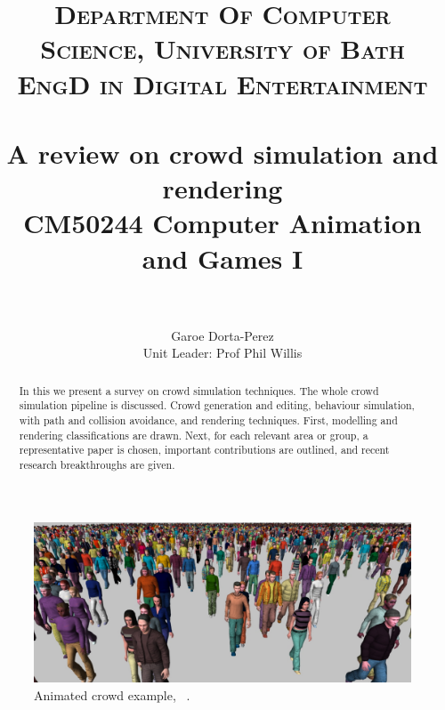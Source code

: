 \documentclass[6pt]{article} %
\title{	
\normalfont \normalsize 
\textsc{Department Of Computer Science, University of Bath} \\ [5pt] %
\textsc{EngD in Digital Entertainment} \\ [5pt] 
\horrule{0.7pt} \\[0.2cm] %
\Huge A review on crowd simulation and rendering \\ %
\vspace{7 mm}
\Large CM50244 \: Computer Animation and Games I \\
\horrule{0.7pt} \\[0.0cm] %
}
\author{Garoe Dorta-Perez \\ \Large Unit Leader: Prof Phil Willis \\}  %
\begin{document}
\vspace*{\fill}
\begin{center}
	\begin{minipage}{1.0\textwidth}
		\maketitle %
		\thispagestyle{empty}
	\end{minipage}
\end{center}



\vfill %
\begin{abstract}
\normalsize %
In this we present a survey on crowd simulation techniques.
The whole crowd simulation pipeline is discussed.
Crowd generation and editing, behaviour simulation, with path and collision avoidance, and rendering techniques.
First, modelling and rendering classifications are drawn.
Next, for each relevant area or group, a representative paper is chosen, important contributions are outlined, and recent research breakthroughs are given.
\end{abstract}
\vfill %

\clearpage %



\begin{figure}
		\centering
		\includegraphics[scale=0.3]{images/crowd2}
		\caption{Animated crowd example, ~\cite{ruiz2013}.}
\end{figure}
\end{document}
